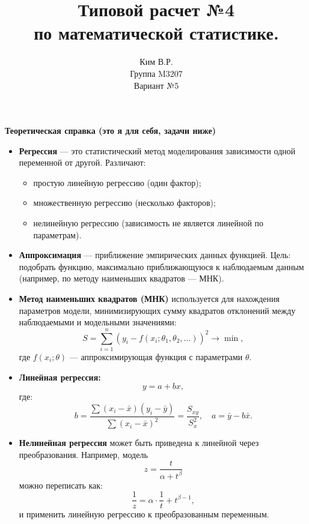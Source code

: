 \documentclass[a4paper,11pt]{article}
\title{Типовой расчет №4 \\ по математической статистике. \\ }
\author{Ким В.Р. \\ Группа M3207 \\ Вариант №5}
\date{}
\newenvironment{shdd}{\begin{mdframed}[backgroundcolor=shadecolor]}{\end{mdframed}}
\theoremstyle{definition}
\begin{document}
    \maketitle

    \begin{shdd}
        \textbf{Теоретическая справка (это я для себя, задачи ниже)}\par\setlength{\parindent}{0pt}
        \begin{itemize}
            \item \textbf{Регрессия} — это статистический метод моделирования зависимости одной переменной от другой. Различают:
            \begin{itemize}
                \item простую линейную регрессию (один фактор);
                \item множественную регрессию (несколько факторов);
                \item нелинейную регрессию (зависимость не является линейной по параметрам).
            \end{itemize}

            \item \textbf{Аппроксимация} — приближение эмпирических данных функцией. Цель: подобрать функцию, максимально приближающуюся к наблюдаемым данным (например, по методу наименьших квадратов — МНК).

            \item \textbf{Метод наименьших квадратов (МНК)} используется для нахождения параметров модели, минимизирующих сумму квадратов отклонений между наблюдаемыми и модельными значениями:
            \[
            S = \sum_{i=1}^n \left( y_i - f(x_i; \theta_1, \theta_2, \dots) \right)^2 \to \min,
            \]
            где \( f(x_i; \theta) \) — аппроксимирующая функция с параметрами \(\theta\).

            \item \textbf{Линейная регрессия:}
            \[
            y = a + bx,
            \]
            где:
            \[
            b = \frac{ \sum (x_i - \bar{x})(y_i - \bar{y}) }{ \sum (x_i - \bar{x})^2 } = \frac{S_{xy}}{S_x^2}, \quad
            a = \bar{y} - b\bar{x}.
            \]

            \item \textbf{Нелинейная регрессия} может быть приведена к линейной через преобразования. Например, модель
            \[
            z = \frac{t}{\alpha + t^\beta}
            \]
            можно переписать как:
            \[
            \frac{1}{z} = \alpha \cdot \frac{1}{t} + t^{\beta - 1},
            \]
            и применить линейную регрессию к преобразованным переменным.


\end{itemize}
\end{shdd}
\end{document}
